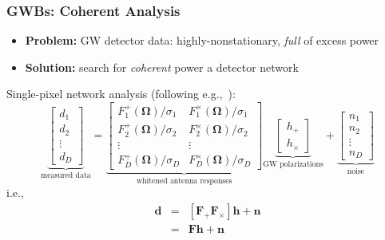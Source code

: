 \documentclass{beamer}
\begin{document}
\begin{frame}
    \frametitle{GWBs: Coherent Analysis}
    \begin{itemize}
        \item {\bf Problem:} GW detector data: highly-nonstationary, \emph{full}
            of excess power
        \item {\bf Solution:} search for \emph{coherent} power a detector
            network
    \end{itemize}
    Single-pixel network analysis (following e.g.,~\cite{XP}):
    \begin{equation}
        \underbrace{
    \left[ \begin{array}
    {c} d_1 \\ d_2  \\ \vdots \\ d_D
    \end{array} \right]}_{\text{measured data}} = 
    \underbrace{\begin{bmatrix} 
            F_1^{+}(\mathbf{\Omega})/\sigma_1 & F_1^{\times}(\mathbf{\Omega})/\sigma_1 \\ 
            F_2^{+}(\mathbf{\Omega})/\sigma_2 & F_2^{\times}(\mathbf{\Omega})/\sigma_2 \\ 
            \vdots & \vdots \\ 
            F_D^{+}(\mathbf{\Omega})/\sigma_D & F_D^{\times}(\mathbf{\Omega})/\sigma_D  
    \end{bmatrix} }_{\text{whitened antenna responses}}
\underbrace{\left[ \begin{array}{c} h_+ \\ h_{\times} \end{array}
    \right]}_{\text{GW polarizations}}
+ \underbrace{\left[ \begin{array}{c} n_1 \\ n_2 \\ \vdots \\ n_D \end{array}
    \right]}_{\text{noise}}
\end{equation}
%
i.e.,
\begin{eqnarray}
    \mathbf{d} & = &\left[\mathbf{F}_+ \mathbf{F}_{\times}\right]\mathbf{h} +
    \mathbf{n} \nonumber \\
    & = & \mathbf{F}\mathbf{h} + \mathbf{n}
\end{eqnarray}


\end{frame}
\end{document}
